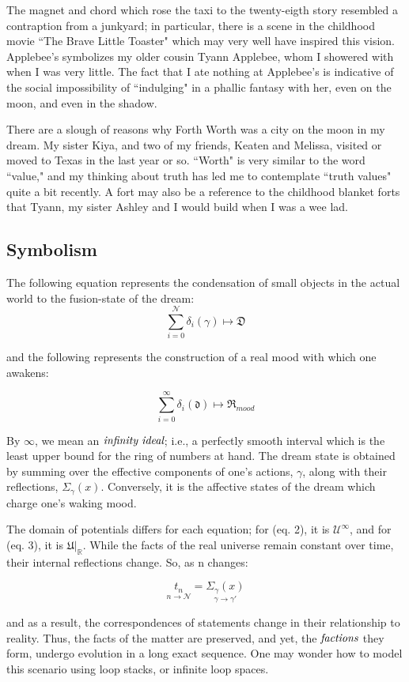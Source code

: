 \documentclass{article}
\begin{document}
The magnet and chord which rose the taxi to the twenty-eigth story resembled a contraption from a junkyard; in particular, there is a scene in the childhood movie ``The Brave Little Toaster" which may very well have inspired this vision. Applebee's symbolizes my older cousin Tyann Applebee, whom I showered with when I was very little. The fact that I ate nothing at Applebee's is indicative of the social impossibility of ``indulging" in a phallic fantasy with her, even on the moon, and even in the shadow.

There are a slough of reasons why Forth Worth was a city on the moon in my dream. My sister Kiya, and two of my friends, Keaten and Melissa, visited or moved to Texas in the last year or so. ``Worth" is very similar to the word ``value," and my thinking about truth has led me to contemplate ``truth values" quite a bit recently. A fort may also be a reference to the childhood blanket forts that Tyann, my sister Ashley and I would build when I was a wee lad.

\subsection{Symbolism}
The following equation represents the condensation of small objects in the actual world to the fusion-state of the dream:
\begin{equation}
	\sum_{i=0}^{\mathcal{N}} \delta_i(\gamma) \mapsto \mathfrak{D}
\end{equation}

and the following represents the construction of a real mood with which one awakens:

\begin{equation}
	\sum_{i=0}^{\infty} \delta_i(\mathfrak{d}) \mapsto \mathfrak{R}_{mood}
\end{equation}

By $\infty$, we mean an $\emph{infinity ideal}$; i.e., a perfectly smooth interval which is the least upper bound for the ring of numbers at hand. The dream state is obtained by summing over the effective components of one's actions, $\gamma$, along with their reflections, $\Sigma_\gamma(x)$. Conversely, it is the affective states of the dream which charge one's waking mood. 

The domain of potentials differs for each equation; for (eq. 2), it is $\mathcal{U}^\infty$, and for (eq. 3), it is $\mathfrak{U}|_\mathbb{R}$. While the facts of the real universe remain constant over time, their internal reflections change. So, as n changes:

\begin{equation}
	\underset{n\to\mathcal{N}}{t_n} = \underset{\gamma \to \gamma'}{\Sigma_\gamma(x)}
\end{equation}

and as a result, the correspondences of statements change in their relationship to reality. Thus, the facts of the matter are preserved, and yet, the $\emph{factions}$ they form, undergo evolution in a long exact sequence. One may wonder how to model this scenario using loop stacks, or infinite loop spaces.
\end{document}
